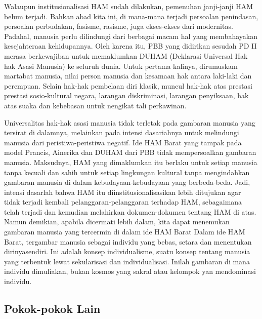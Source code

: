 \documentclass[11pt,twoside,a5paper,openany]{memoir}
\begin{document}
Walaupun institusionalisasi HAM sudah dilakukan, pemenuhan janji-janji
HAM belum terjadi. Bahkan abad kita ini, di mana-mana terjadi persoalan
penindasan, persoalan perbudakan, fasisme, rasisme, juga ekses-ekses
dari modernitas. Padahal, manusia perlu dilindungi dari berbagai macam
hal yang membahayakan kesejahteraan kehidupannya. Oleh karena itu, PBB
yang didirikan sesudah PD II merasa berkewajiban untuk memaklumkan DUHAM
(Deklarasi Universal Hak hak Asasi Manusia) ke seluruh dunia. Untuk
pertama kalinya, dirumuskanı martabat manusia, nilai person manusia dan
kesamaan hak antara laki-laki dan perempuan. Selain hak-hak pembelaan
diri klasik, muncul hak-hak atas prestasi prestasi sosio-kultural
negara, larangan diskriminasi, larangan penyiksaan, hak atas suaka dan
kebebasan untuk nengikat tali perkawinan.

Universalitas hak-hak asasi manusia tidak terletak pada gambaran manusia
yang tersirat di dalamnya, melainkan pada intensi dasariahnya untuk
melindungi manusia dari peristiwa-peristiwa negatif. Ide HAM Barat yang
tampak pada model Prancis, Ainerika dan DUHAM dari PBB tidak
mempersoalkan gambaran manusia. Maksudnya, HAM yang dimaklumkan itu
berlaku untuk setiap manusia tanpa kecuali dan sahih untuk setiap
lingkungan kultural tanpa mengindahkan gambaran manusia di dalam
kebudayaan-kebudayaan yang berbeda-beda. Jadi, intensi dasarlah bahwa
HAM itu diinstitusionalisasikan lebih ditujukan agar tidak terjadi
kembali pelanggaran-pelanggaran terhadap HAM, sebagaimana telah terjadi
dan kemudian melahirkan dokumen-dokumen tentang HAM di atas. Namun
demikian, apabila dicermati lebih dalam, kita dapat menemukan gambaran
manusia yang tercermin di dalam ide HAM Barat Dalam ide HAM Barat,
tergambar manusia sebagai individu yang bebas, setara dan menentukan
dirinyasendiri. Ini adalah konsep individualisme, suatu konsep tentang
manusia yang terbentuk lewat sekularisasi dan individualisasi. Inilah
gambaran di mana individu dimuliakan, bukan kosmos yang sakral atau
kelompok yan mendominasi individu.

\hypertarget{pokok-pokok-lain-3}{%
\subsection{Pokok-pokok Lain}\label{pokok-pokok-lain-3}}
\end{document}
